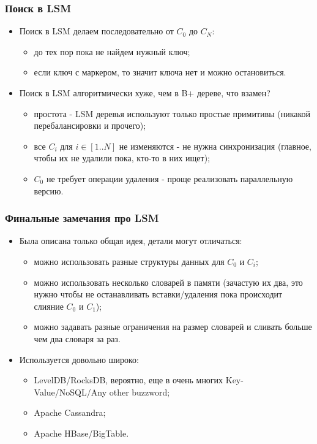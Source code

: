 \begin{frame}
\frametitle{Поиск в LSM}
\begin{itemize}
  \item Поиск в LSM делаем последовательно от $C_0$ до $C_N$:
  \begin{itemize}
    \item до тех пор пока не найдем нужный ключ;
    \item если ключ с маркером, то значит ключа нет и можно остановиться.
  \end{itemize}
  \item Поиск в LSM алгоритмически хуже, чем в B+ дереве, что взамен?
  \begin{itemize}
    \item простота - LSM деревья используют только простые примитивы (никакой
    перебалансировки и прочего);
    \item все $C_i$ для $i \in \left[1..N\right]$ не изменяются - не нужна
    синхронизация (главное, чтобы их не удалили пока, кто-то в них ищет);
    \item $C_0$ не требует операции удаления - проще реализовать параллельную
    версию.
  \end{itemize}
\end{itemize}
\end{frame}

\begin{frame}
\frametitle{Финальные замечания про LSM}
\begin{itemize}
  \item Была описана только общая идея, детали могут отличаться:
  \begin{itemize}
    \item можно использовать разные структуры данных для $C_0$ и $C_i$;
    \item можно использовать несколько словарей в памяти (зачастую их два,
    это нужно чтобы не останавливать вставки/удаления пока происходит слияние
    $C_0$ и $C_1$);
    \item можно задавать разные ограничения на размер словарей и сливать
    больше чем два словаря за раз.
  \end{itemize}
  \item Используется довольно широко:
  \begin{itemize}
    \item LevelDB/RocksDB, вероятно, еще в очень многих Key-Value/NoSQL/Any
    other buzzword;
    \item Apache Cassandra;
    \item Apache HBase/BigTable.
  \end{itemize}
\end{itemize}
\end{frame}
